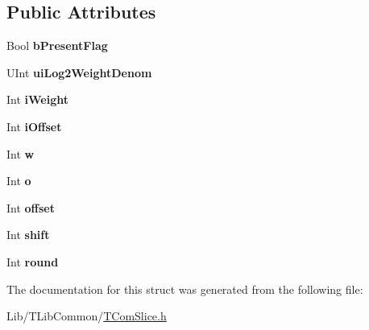 \subsection*{Public Attributes}
\begin{DoxyCompactItemize}
\item 
\mbox{\label{struct_w_p_scaling_param_adb47cea71391197eb403ac416d9a5c78}} 
Bool {\bfseries b\+Present\+Flag}
\item 
\mbox{\label{struct_w_p_scaling_param_abf3bf0e67b88e32a86d5de832322500f}} 
U\+Int {\bfseries ui\+Log2\+Weight\+Denom}
\item 
\mbox{\label{struct_w_p_scaling_param_ad282b58832229a3c0cb87aecb5c7b22e}} 
Int {\bfseries i\+Weight}
\item 
\mbox{\label{struct_w_p_scaling_param_a4f2fbda17db2e4381f1a245483e77802}} 
Int {\bfseries i\+Offset}
\item 
\mbox{\label{struct_w_p_scaling_param_a72cbb5a871809a59fb69eac268425f39}} 
Int {\bfseries w}
\item 
\mbox{\label{struct_w_p_scaling_param_a539d13704bcda1de12174d53c01892a0}} 
Int {\bfseries o}
\item 
\mbox{\label{struct_w_p_scaling_param_abe237c18d9a9fc8958e1374dce7689ba}} 
Int {\bfseries offset}
\item 
\mbox{\label{struct_w_p_scaling_param_a9001d60f72aa340229c75cb4869f9d40}} 
Int {\bfseries shift}
\item 
\mbox{\label{struct_w_p_scaling_param_ad88fc0e8975c366e884402921f709cec}} 
Int {\bfseries round}
\end{DoxyCompactItemize}


The documentation for this struct was generated from the following file\+:\begin{DoxyCompactItemize}
\item 
Lib/\+T\+Lib\+Common/\hyperlink{_t_com_slice_8h}{T\+Com\+Slice.\+h}\end{DoxyCompactItemize}

